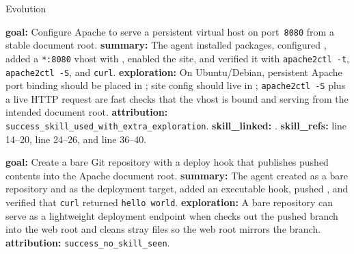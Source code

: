 \begin{svpromptbox}{Evolution}
\svpartsep
{}

\svpartsep
{}
\begin{enumerate}[label=\textnormal{[\arabic*]}, leftmargin=*]
    \item \textbf{goal:} Configure Apache to serve a persistent virtual host on port~\texttt{8080} from a stable document root. \textbf{summary:} The agent installed packages, configured , added a \texttt{*:8080} vhost with , enabled the site, and verified it with \texttt{apache2ctl -t}, \texttt{apache2ctl -S}, and \texttt{curl}. \textbf{exploration:} On Ubuntu/Debian, persistent Apache port binding should be placed in ; site config should live in ; \texttt{apache2ctl -S} plus a live HTTP request are fast checks that the vhost is bound and serving from the intended document root. \textbf{attribution:} \texttt{success\_skill\_used\_with\_extra\_exploration}. \textbf{skill\_linked:} . \textbf{skill\_refs:}  line 14--20, line 24--26, and line 36--40.
    \item \textbf{goal:} Create a bare Git repository with a deploy hook that publishes pushed  contents into the Apache document root. \textbf{summary:} The agent created  as a bare repository and  as the deployment target, added an executable  hook, pushed , and verified that \texttt{curl} returned \texttt{hello world}. \textbf{exploration:} A bare repository can serve as a lightweight deployment endpoint when  checks out the pushed branch into the web root and cleans stray files so the web root mirrors the branch. \textbf{attribution:} \texttt{success\_no\_skill\_seen}.
\end{enumerate}


\end{svpromptbox}
